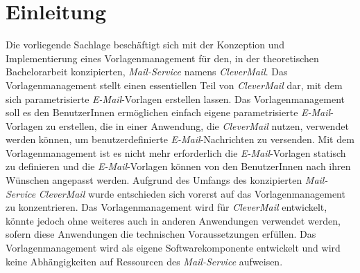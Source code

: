\chapter{Einleitung}
\label{cha:Einleitung}
Die vorliegende Sachlage beschäftigt sich mit der Konzeption und Implementierung eines Vorlagenmanagement für den, in der theoretischen Bachelorarbeit konzipierten, \emph{Mail-Service} namens \emph{CleverMail}. Das Vorlagenmanagement stellt einen essentiellen Teil von \emph{CleverMail} dar, mit dem sich parametrisierte \emph{E-Mail}-Vorlagen erstellen lassen. Das Vorlagenmanagement soll es den BenutzerInnen ermöglichen einfach eigene parametrisierte \emph{E-Mail}-Vorlagen zu erstellen, die in einer Anwendung, die \emph{CleverMail} nutzen, verwendet werden können, um benutzerdefinierte \emph{E-Mail}-Nachrichten zu versenden. Mit dem Vorlagenmanagement ist es nicht mehr erforderlich die \emph{E-Mail}-Vorlagen statisch zu definieren und die \emph{E-Mail}-Vorlagen können von den BenutzerInnen nach ihren Wünschen angepasst werden.
\newline
\newline
Aufgrund des Umfangs des konzipierten \emph{Mail-Service} \emph{CleverMail} wurde entschieden sich vorerst auf das Vorlagenmanagement zu konzentrieren. Das Vorlagenmanagement wird für \emph{CleverMail} entwickelt, könnte jedoch ohne weiteres auch in anderen Anwendungen verwendet werden, sofern diese Anwendungen die technischen Voraussetzungen erfüllen. Das Vorlagenmanagement wird als eigene Softwarekomponente entwickelt und wird keine Abhängigkeiten auf Ressourcen des \emph{Mail-Service} aufweisen.

